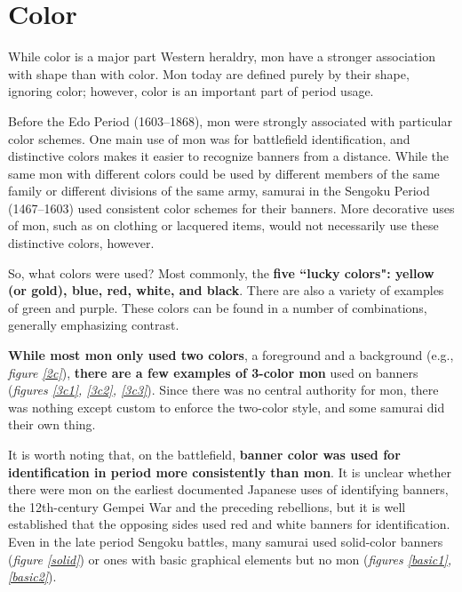 \documentclass{article}
\newcounter{fig}
\def\SengokuPeriod{Sengoku Period (1467--1603)}
\def\EdoPeriod{Edo Period (1603--1868)}
\begin{document}
\section{Color}

  While color is a major part Western heraldry, mon have a
  stronger association with shape than with color.  Mon today are
  defined purely by their shape, ignoring color; however, color is an
  important part of period usage.

  Before the \EdoPeriod, mon were strongly associated with particular
  color schemes.  One main use of mon was for battlefield
  identification, and distinctive colors makes it easier to recognize
  banners from a distance.  While the same mon with different colors
  could be used by different members of the same family or different
  divisions of the same army, samurai in the
  \SengokuPeriod{} used consistent color schemes for their banners.
  More decorative uses of mon, such as on clothing or lacquered items,
  would not necessarily use these distinctive colors, however.

  So, what colors were used?  Most commonly, the \textbf{five ``lucky
  colors": yellow (or gold), blue, red, white, and
  black}. There are also a variety of examples
  of green and purple.  These colors can be found in a number of
  combinations, generally emphasizing contrast.

  \textbf{While most mon only used two colors}, a foreground and a background
  (e.g., \emph{figure \ref{2c}}), \textbf{there are a few examples of 3-color mon}
  used on banners (\emph{figures \ref{3c1}, \ref{3c2},
  \ref{3c3}}). Since there was no central
  authority for mon, there was nothing except custom to enforce the
  two-color style, and some samurai did their own thing.

  It is worth noting that, on the battlefield, \textbf{banner color was used for identification in period more
  consistently than mon}.  It is unclear whether there were mon on the
  earliest documented Japanese uses of identifying banners, the
  12th-century Gempei War and the preceding rebellions, but it is well
  established that the opposing sides used red and white banners for
  identification. Even in the late period
  Sengoku battles, many samurai used solid-color
  banners (\emph{figure \ref{solid}}) or ones with basic graphical
  elements but no mon (\emph{figures \ref{basic1}, \ref{basic2}}).
\end{document}

